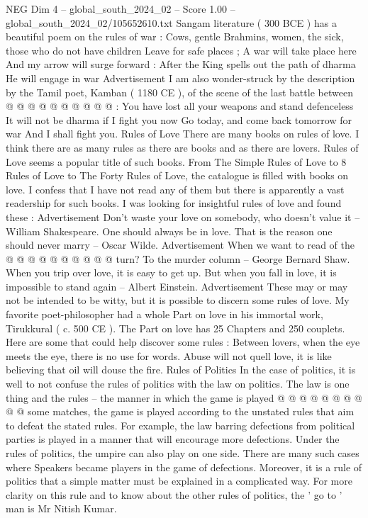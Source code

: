 \begin{textsample}{NEG Dim 4 – global\_south\_2024\_02 – Score 1.00 – global\_south\_2024\_02/105652610.txt}
Sangam literature ( 300 BCE ) has a beautiful poem on the rules of war : Cows, gentle Brahmins, women, the sick, those who do not have children Leave for safe places ; A war will take place here And my arrow will surge forward : After the King spells out the path of dharma He will engage in war Advertisement I am also wonder-struck by the description by the Tamil poet, Kamban ( 1180 CE ), of the scene of the last battle between @ @ @ @ @ @ @ @ @ @ : You have lost all your weapons and stand defenceless It will not be dharma if I fight you now Go today, and come back tomorrow for war And I shall fight you.
Rules of Love There are many books on rules of love.
I think there are as many rules as there are books and as there are lovers.
Rules of Love seems a popular title of such books.
From The Simple Rules of Love to 8 Rules of Love to The Forty Rules of Love, the catalogue is filled with books on love.
I confess that I have not read any of them but there is apparently a vast readership for such books.
I was looking for insightful rules of love and found these : Advertisement Don't waste your love on somebody, who doesn't value it -- William Shakespeare.
One should always be in love.
That is the reason one should never marry -- Oscar Wilde.
Advertisement When we want to read of the @ @ @ @ @ @ @ @ @ @ turn?
To the murder column -- George Bernard Shaw.
When you trip over love, it is easy to get up.
But when you fall in love, it is impossible to stand again -- Albert Einstein.
Advertisement These may or may not be intended to be witty, but it is possible to discern some rules of love.
My favorite poet-philosopher had a whole Part on love in his immortal work, Tirukkural ( c. 500 CE ).
The Part on love has 25 Chapters and 250 couplets.
Here are some that could help discover some rules : Between lovers, when the eye meets the eye, there is no use for words.
Abuse will not quell love, it is like believing that oil will douse the fire.
Rules of Politics In the case of politics, it is well to not confuse the rules of politics with the law on politics.
The law is one thing and the rules -- the manner in which the game is played @ @ @ @ @ @ @ @ @ @ some matches, the game is played according to the unstated rules that aim to defeat the stated rules.
For example, the law barring defections from political parties is played in a manner that will encourage more defections.
Under the rules of politics, the umpire can also play on one side.
There are many such cases where Speakers became players in the game of defections.
Moreover, it is a rule of politics that a simple matter must be explained in a complicated way.
For more clarity on this rule and to know about the other rules of politics, the ' go to ' man is Mr Nitish Kumar.

\end{textsample}
